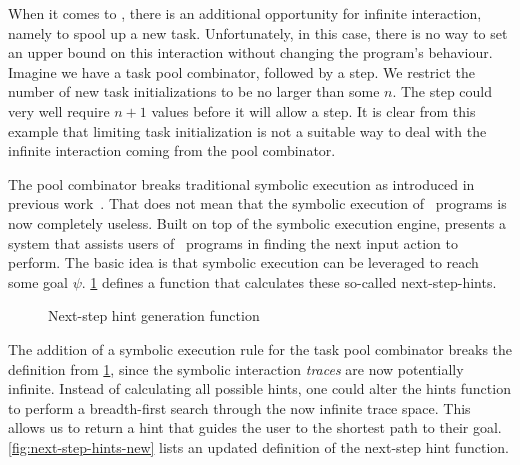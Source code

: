When it comes to \DYNTOPHAT, there is an additional opportunity for infinite interaction, namely to spool up a new task.
Unfortunately, in this case, there is no way to set an upper bound on this interaction without changing the program's behaviour.
Imagine we have a task pool combinator, followed by a step.
We restrict the number of new task initializations to be no larger than some $n$.
The step could very well require $n+1$ values before it will allow a step.
It is clear from this example that limiting task initialization is not a suitable way to deal with the infinite interaction coming from the pool combinator.

The pool combinator breaks traditional symbolic execution as introduced in previous work~\cite{conf/ifl/NausSK19}.
That does not mean that the symbolic execution of \DYNTOPHAT\ programs is now completely useless.
Built on top of the symbolic execution engine, \citet{conf/sfp/NausS20} presents a system that assists users of \TOPHAT\ programs in finding the next input action to perform.
The basic idea is that symbolic execution can be leveraged to reach some goal $\psi$.
\cref{fig:next-step-hints} defines a function that calculates these so-called next-step-hints.

\begin{figure}
  \begin{mathpar}
  \end{mathpar}
  \caption{Next-step hint generation function}
  \label{fig:next-step-hints}
\end{figure}

The addition of a symbolic execution rule for the task pool combinator breaks the definition from \cref{fig:next-step-hints}, since the symbolic interaction \textit{traces} are now potentially infinite.
Instead of calculating all possible hints, one could alter the hints function to perform a breadth-first search through the now infinite trace space.
This allows us to return a hint that guides the user to the shortest path to their goal.
\cref{fig:next-step-hints-new} lists an updated definition of the next-step hint function.



\begin{figure*}
  \begin{mathpar}
  \end{mathpar}
  \caption{Altered next-step hint generation function}
  \label{fig:next-step-hints-new}
\end{figure*}

